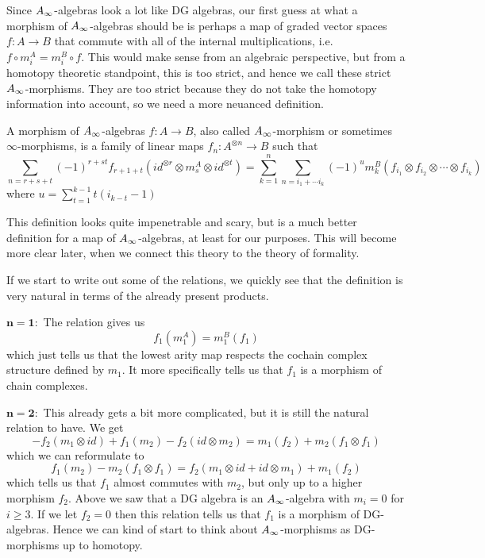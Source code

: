 Since $\A$-algebras look a lot like DG algebras, our first guess at what a morphism of $\A$-algebras should be is perhaps a map of graded vector spaces $f:A\longrightarrow B$ that commute with all of the internal multiplications, i.e. $f\circ m^A_i = m^B_i\circ f$. This would make sense from an algebraic perspective, but from a homotopy theoretic standpoint, this is too strict, and hence we call these strict $\A$-morphisms. They are too strict because they do not take the homotopy information into account, so we need a more neuanced definition. 

\begin{definition}[$\A$-morphism]
A morphism of $\A$-algebras $f:A\rightarrow B$, also called $\A$-morphism or sometimes $\infty$-morphisms, is a family of linear maps $f_n:A^{\otimes n}\rightarrow B$ such that 
\begin{equation*}
    \sum_{n = r+s+t}(-1)^{r+st}f_{r+1+t}(id^{\otimes r}\otimes m_s^A \otimes id^{\otimes t}) = \sum_{k=1}^{n}\sum_{n=i_1+\cdots i_k}(-1)^{u} m_k^B(f_{i_1}\otimes f_{i_2}\otimes \cdots \otimes f_{i_k})
\end{equation*}
where $u=\displaystyle \sum_{t=1}^{k-1}t(i_{k-t}-1)$
\end{definition}

This definition looks quite impenetrable and scary, but is a much better definition for a map of $\A$-algebras, at least for our purposes. This will become more clear later, when we connect this theory to the theory of formality.  

If we start to write out some of the relations, we quickly see that the definition is very natural in terms of the already present products.

$\mathbf{n=1 :}$ The relation gives us
\begin{equation*}
    f_1(m_1^A) = m_1^B(f_1)
\end{equation*}
which just tells us that the lowest arity map respects the cochain complex structure defined by $m_1$. It more specifically tells us that $f_1$ is a morphism of chain complexes. 

$\mathbf{n=2 :}$ This already gets a bit more complicated, but it is still the natural relation to have. We get
\begin{equation*}
    -f_2(m_1\otimes id)+f_1(m_2)-f_2(id\otimes m_2) = m_1(f_2)+m_2(f_1\otimes f_1)
\end{equation*}
which we can reformulate to 
\begin{equation*}
    f_1(m_2)-m_2(f_1\otimes f_1) = f_2(m_1\otimes id + id\otimes m_1) + m_1(f_2)
\end{equation*}
which tells us that $f_1$ almost commutes with $m_2$, but only up to a higher morphism $f_2$. Above we saw that a DG algebra is an $\A$-algebra with $m_i=0$ for $i\geq 3$. If we let $f_2=0$ then this relation tells us that $f_1$ is a morphism of DG-algebras. Hence we can kind of start to think about $\A$-morphisms as DG-morphisms up to homotopy.  

